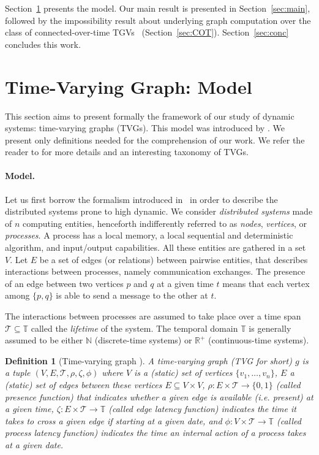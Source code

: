 \documentclass[11pt]{article}
\newtheorem{definition}{Definition}
\begin{document}
Section~\ref{sec:TVG} presents the model. Our main result is presented in Section~\ref{sec:main}, followed by the impossibility result about underlying graph computation over the class of connected-over-time TGVs~ (Section~\ref{sec:COT}). Section~\ref{sec:conc} concludes this work. 

\section{Time-Varying Graph: Model}\label{sec:TVG}

This section aims to present formally the framework of our study of dynamic systems: time-varying graphs (TVGs). This model was introduced by \cite{CFQS12}. We present only definitions needed for the comprehension of our work.  We refer the reader to \cite{CFQS12} for more details 
and an interesting taxonomy of TVGs. 

\paragraph{Model.}\label{sub:model}

Let us first borrow the formalism introduced in~\cite{CFQS12} in order to describe the distributed systems prone to high dynamic. We consider {\em distributed systems} made of $n$ computing entities, henceforth indifferently referred to as {\em nodes}, {\em vertices}, or {\em processes}. A process has a local memory, a local sequential and deterministic algorithm, and input\slash output capabilities. All these entities are gathered in a set $V$.  Let $E$ be a set of edges (or relations) between pairwise entities, that describes interactions between processes, namely communication exchanges. The presence of an edge between two vertices $p$ and $q$ at a given time $t$ means that each vertex among $\{p,q\}$ is able to send a message to the other at $t$.

The interactions between processes are assumed to take place over a time span $\mathcal{T} \subseteq \mathbb{T}$ called the {\em lifetime} of the system. The temporal domain $\mathbb{T}$ is generally assumed to be either $\mathbb{N}$ (discrete-time systems) or $\mathbb{R}^+$ (continuous-time systems).

\begin{definition}[Time-varying graph \cite{CFQS12}]
\label{def:TVG}
A time-varying graph (TVG for short) $g$ is a tuple $(V,E,\mathcal{T},\rho,\zeta,\phi)$ where $V$ is a (static) set of vertices $\{v_1,\ldots,v_n\}$, $E$ a (static) set of edges between these vertices $E\subseteq V\times V$, $\rho:E\times\mathcal{T}\to\{0,1\}$ (called presence function) that indicates whether a given edge is available (\emph{i.e.} present) at a given time, $\zeta:E\times\mathcal{T}\rightarrow \mathbb{T}$ (called edge latency function) indicates the time it takes to cross a given edge if starting at a given date, and $\phi:V\times\mathcal{T}\rightarrow \mathbb{T}$ (called process latency function) indicates the time an internal action of a process takes at a given date.
\end{definition}
\end{document}
